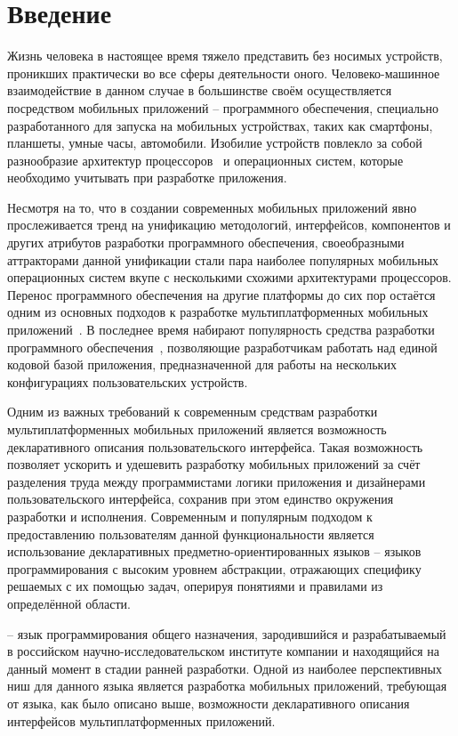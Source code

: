 \section*{Введение}
Жизнь человека в настоящее время тяжело представить без носимых устройств, проникших практически во все сферы деятельности оного.
Человеко-машинное взаимодействие в данном случае в большинстве своём осуществляется посредством мобильных приложений -- программного обеспечения, специально разработанного для запуска на мобильных устройствах, таких как смартфоны, планшеты, умные часы, автомобили.
Изобилие устройств повлекло за собой разнообразие архитектур процессоров~\cite{cpu-arches, mobile-phones-cpu-trends} и операционных систем, которые необходимо учитывать при разработке приложения.

Несмотря на то, что в создании современных мобильных приложений явно прослеживается тренд на унификацию методологий, интерфейсов, компонентов и других атрибутов разработки программного обеспечения, своеобразными аттракторами данной унификации стали пара наиболее популярных мобильных операционных систем вкупе с несколькими схожими архитектурами процессоров. 
Перенос программного обеспечения на другие платформы до сих пор остаётся одним из основных подходов к разработке мультиплатформенных мобильных приложений~\cite{mob-apps-approaches}.
В последнее время набирают популярность средства разработки программного обеспечения~\cite{kotlin-homepage,swift-homepage,flutter-homepage,reactnative-homepage, vuenative-homepage}, позволяющие разработчикам работать над единой кодовой базой приложения, предназначенной для работы на нескольких конфигурациях пользовательских устройств.

Одним из важных требований к современным средствам разработки мультиплатформенных мобильных приложений является возможность декларативного описания пользовательского интерфейса.
Такая возможность позволяет ускорить и удешевить разработку мобильных приложений за счёт разделения труда между программистами логики приложения и дизайнерами пользовательского интерфейса, сохранив при этом единство окружения разработки и исполнения.
Современным и популярным подходом к предоставлению пользователям данной функциональности является использование декларативных предметно-ориентированных языков -- языков программирования с высоким уровнем абстракции, отражающих специфику решаемых с их помощью задач, оперируя понятиями и правилами из определённой области.

 -- язык программирования общего назначения, зародившийся и разрабатываемый в российском научно-исследовательском институте компании  и находящийся на данный момент в стадии ранней разработки.
Одной из наиболее перспективных ниш для данного языка является разработка мобильных приложений, требующая от языка, как было описано выше, возможности декларативного описания интерфейсов мультиплатформенных приложений.